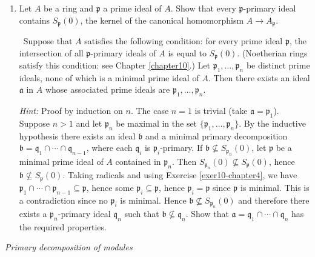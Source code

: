 \begin{enumerate}
    \item \label{exer19-chapter4}Let $A$ be a ring and $\mathfrak{p}$ a prime ideal of $A$. Show that every $\mathfrak{p}$-primary ideal contains $S_{\mathfrak{p}}(0)$, the kernel of the canonical homomorphism $A \to A_{\mathfrak{p}}$.
    
    \quad\, Suppose that $A$ satisfies the following condition: for every prime ideal $\mathfrak{p}$, the intersection of all $\mathfrak{p}$-primary ideals of $A$ is equal to $S_{\mathfrak{p}}(0)$. (Noetherian rings satisfy this condition: see Chapter \ref{chapter10}.) Let $\mathfrak{p}_1, \ldots, \mathfrak{p}_n$ be distinct prime ideals, none of which is a minimal prime ideal of $A$. Then there exists an ideal $\mathfrak{a}$ in $A$ whose associated prime ideals are $\mathfrak{p}_1, \ldots, \mathfrak{p}_n$.

    \textit{Hint:} Proof by induction on $n$. The case $n = 1$ is trivial (take $\mathfrak{a} = \mathfrak{p}_1$). Suppose $n > 1$ and let $\mathfrak{p}_n$ be maximal in the set $\{\mathfrak{p}_1, \ldots, \mathfrak{p}_n\}$. By the inductive hypothesis there exists an ideal $\mathfrak{b}$ and a minimal primary decomposition $\mathfrak{b} = \mathfrak{q}_1 \cap \cdots \cap \mathfrak{q}_{n-1}$, where each $\mathfrak{q}_i$ is $\mathfrak{p}_i$-primary. If $\mathfrak{b} \not\subseteq S_{\mathfrak{p}_n}(0)$, let $\mathfrak{p}$ be a minimal prime ideal of $A$ contained in $\mathfrak{p}_n$. Then $S_{\mathfrak{p}_n}(0) \not\subseteq S_{\mathfrak{p}}(0)$, hence $\mathfrak{b} \not\subseteq S_{\mathfrak{p}}(0)$. Taking radicals and using Exercise \ref{exer10-chapter4}, we have $\mathfrak{p}_1 \cap \cdots \cap \mathfrak{p}_{n-1} \subseteq \mathfrak{p}$, hence some $\mathfrak{p}_i \subseteq \mathfrak{p}$, hence $\mathfrak{p}_i = \mathfrak{p}$ since $\mathfrak{p}$ is minimal. This is a contradiction since no $\mathfrak{p}_i$ is minimal. Hence $\mathfrak{b} \not\subseteq S_{\mathfrak{p}_n}(0)$ and therefore there exists a $\mathfrak{p}_n$-primary ideal $\mathfrak{q}_n$ such that $\mathfrak{b} \not\subseteq \mathfrak{q}_n$. Show that $\mathfrak{a} = \mathfrak{q}_1 \cap \cdots \cap \mathfrak{q}_n$ has the required properties.
\end{enumerate}

\emph{Primary decomposition of modules}

